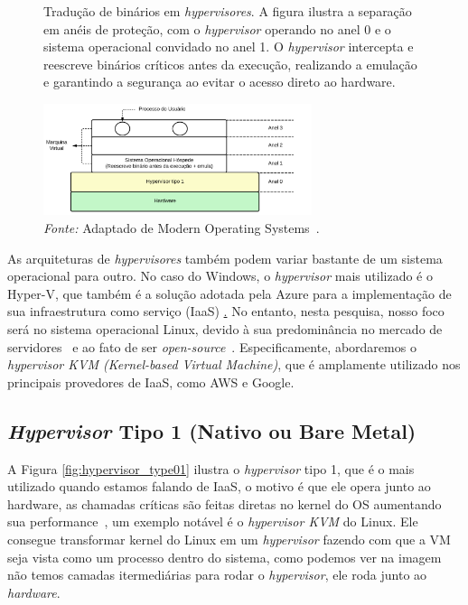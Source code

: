 \begin{figure}[htbp]
  \centering
  \caption{Tradução de binários em \textit{hypervisores}. A figura ilustra a separação em anéis de proteção, com o \textit{hypervisor} operando no anel 0 e o sistema operacional convidado no anel 1. O \textit{hypervisor} intercepta e reescreve binários críticos antes da execução, realizando a emulação e garantindo a segurança ao evitar o acesso direto ao hardware.}
  \includegraphics[width=0.7\textwidth]{images/BinaryTranslate.png}
  \caption*{\textit{Fonte:} Adaptado de Modern Operating Systems~\citep{modernOS}.}
  \label{fig:binary_translate}
\end{figure}


As arquiteturas de \textit{hypervisores} também podem variar bastante de um sistema operacional para outro. No caso do Windows, o \textit{hypervisor} mais utilizado é o Hyper-V, que também é a solução adotada pela Azure para a implementação de sua infraestrutura como serviço (IaaS) \href{https://learn.microsoft.com/pt-br/azure/architecture/reference-architectures/n-tier/high-security-iaas}. No entanto, nesta pesquisa, nosso foco será no sistema operacional Linux, devido à sua predominância no mercado de servidores~\citep{OperationSystemMarketVolume} e ao fato de ser \textit{open-source}~\citep{WhyUseLinux}. Especificamente, abordaremos o \textit{hypervisor KVM (Kernel-based Virtual Machine)}, que é amplamente utilizado nos principais provedores de IaaS, como AWS e Google.


\subsection{\textit{Hypervisor} Tipo 1 (Nativo ou Bare Metal)}

A Figura \ref{fig:hypervisor_type01} ilustra o \textit{hypervisor} tipo 1, que é o mais utilizado quando estamos falando de IaaS, o motivo é que ele opera junto ao hardware, as chamadas críticas são feitas diretas no kernel do OS aumentando sua performance~\citep{chirammal2016mastering}, um exemplo notável é o \textit{hypervisor KVM} do Linux. Ele consegue transformar kernel do Linux em um \textit{hypervisor} fazendo com que a VM seja vista como um processo dentro do sistema, como podemos ver na imagem não temos camadas itermediárias para rodar o \textit{hypervisor}, ele roda junto ao \textit{hardware}.


